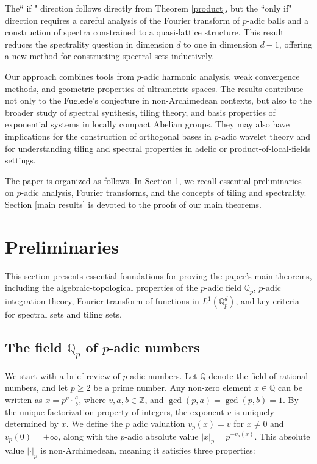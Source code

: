 \documentclass[a4paper,12pt]{amsart}
\def\Qp{\mathbb{Q}_p}
\begin{document}
The`` if " direction follows directly from Theorem \ref{product},
but the ``only if"  direction requires a careful analysis of the Fourier transform of $p$-adic
balls and a construction of spectra constrained to a quasi-lattice structure. This result reduces
the spectrality question in dimension $d$ to one in dimension $d-1$, offering a new method for
constructing spectral sets inductively.


Our approach combines tools from $p$-adic harmonic analysis, weak convergence methods, and geometric
properties of ultrametric spaces. The results contribute not only to the Fuglede's conjecture in
non-Archimedean contexts, but also to the broader study of spectral synthesis, tiling theory,
and basis properties of exponential systems in locally compact Abelian groups. They may also have
implications for the construction of orthogonal bases in $p$-adic wavelet theory and for understanding
tiling and spectral properties in adelic or product-of-local-fields settings.%



The paper is organized as follows. In Section \ref{prelim}, we recall essential preliminaries on $p$-adic analysis,
Fourier transforms, and the concepts of tiling and spectrality.
Section \ref{main results} is devoted to the proofs of our main theorems.


\section{Preliminaries}\label{prelim}
This section presents essential foundations for proving the paper's main theorems,
including the algebraic-topological properties of the $p$-adic field $\Qp$,
$p$-adic integration theory, Fourier transform of functions in $L^1(\Qp^d)$,
and key criteria for spectral sets and tiling sets.

\subsection{The field $\Qp$ of $p$-adic numbers}

We start with a brief review  of $p$-adic numbers. Let \(\mathbb{Q}\) denote the field of rational numbers,
and let \(p \geq 2\) be a prime number. Any non-zero element \(x \in \mathbb{Q}\) can be written as \(x = p^v \cdot \frac{a}{b}\),
where \(v, a, b \in \mathbb{Z}\), and \(\gcd(p, a) = \gcd(p, b) = 1\).
By the unique factorization property of integers, the exponent \(v\) is uniquely determined
by \(x\). We define the \(p\) adic valuation \(v_p(x) = v\) for \(x \neq 0\) and
\(v_p(0) = +\infty\), along with the \(p\)-adic absolute value \(|x|_p = p^{-v_p(x)}\).
This absolute value \(|\cdot|_p \) is non-Archimedean, meaning it satisfies three properties:\\
\end{document}
